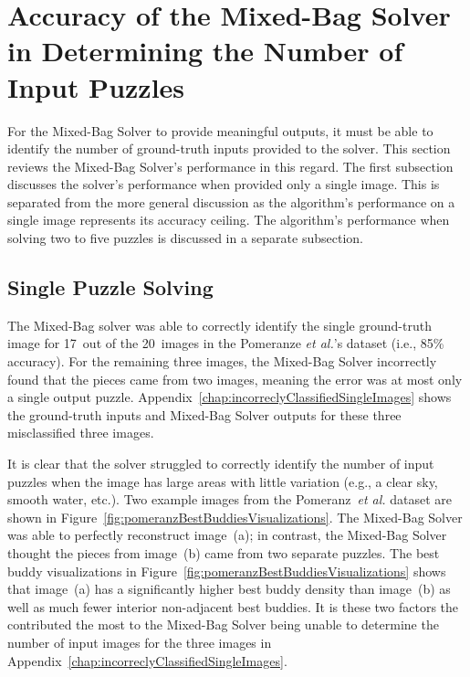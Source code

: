 \section{Accuracy of the Mixed-Bag Solver in Determining the Number of Input Puzzles}

For the Mixed-Bag Solver to provide meaningful outputs, it must be able to identify the number of ground-truth inputs provided to the solver.  This section reviews the Mixed-Bag Solver's performance in this regard.  The first subsection discusses the solver's performance when provided only a single image.  This is separated from the more general discussion as the algorithm's performance on a single image represents its accuracy ceiling.  The algorithm's performance when solving two to five puzzles is discussed in a separate subsection.

\subsection{Single Puzzle Solving}\label{sec:singlePuzzleSolving}

The Mixed-Bag solver was able to correctly identify the single ground-truth image for 17~out of the 20~images in the Pomeranze \textit{et al.}'s dataset (i.e., 85\% accuracy).  For the remaining three images, the Mixed-Bag Solver incorrectly found that the pieces came from two images, meaning the error was at most only a single output puzzle. Appendix~\ref{chap:incorreclyClassifiedSingleImages} shows the ground-truth inputs and Mixed-Bag Solver outputs for these three misclassified three images.  

It is clear that the solver struggled to correctly identify the number of input puzzles when the image has large areas with little variation (e.g., a clear sky, smooth water, etc.). Two example images from the Pomeranz~\textit{et al.} dataset are shown in Figure~\ref{fig:pomeranzBestBuddiesVisualizations}.  The Mixed-Bag Solver was able to perfectly reconstruct image~(a); in contrast, the Mixed-Bag Solver thought the pieces from image~(b) came from two separate puzzles. The best buddy visualizations in Figure~\ref{fig:pomeranzBestBuddiesVisualizations} shows that image~(a) has a significantly higher best buddy density than image~(b) as well as much fewer interior non-adjacent best buddies.  It is these two factors the contributed the most to the Mixed-Bag Solver being unable to determine the number of input images for the three images in Appendix~\ref{chap:incorreclyClassifiedSingleImages}. 

